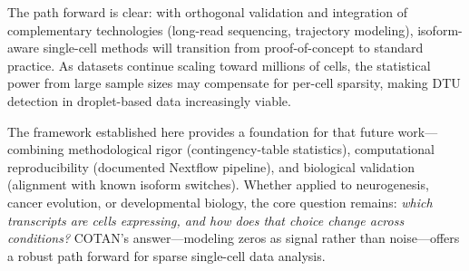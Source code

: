 The path forward is clear: with orthogonal validation and integration of complementary technologies (long-read sequencing, trajectory modeling), isoform-aware single-cell methods will transition from proof-of-concept to standard practice. As datasets continue scaling toward millions of cells, the statistical power from large sample sizes may compensate for per-cell sparsity, making DTU detection in droplet-based data increasingly viable.

The framework established here provides a foundation for that future work---combining methodological rigor (contingency-table statistics), computational reproducibility (documented Nextflow pipeline), and biological validation (alignment with known isoform switches). Whether applied to neurogenesis, cancer evolution, or developmental biology, the core question remains: \textit{which transcripts are cells expressing, and how does that choice change across conditions?} COTAN's answer---modeling zeros as signal rather than noise---offers a robust path forward for sparse single-cell data analysis.